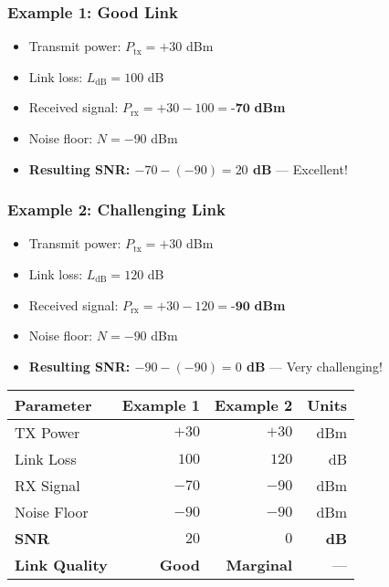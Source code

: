 \subsubsection{Example 1: Good Link}\label{example-1-good-link}

\begin{itemize}
\item Transmit power: $P_{\text{tx}} = +30$ dBm
\item Link loss: $L_{\text{dB}} = 100$ dB
\item Received signal: $P_{\text{rx}} = +30 - 100 = \textbf{-70}$ \textbf{dBm}
\item Noise floor: $N = -90$ dBm
\item \textbf{Resulting SNR: $-70 - (-90) = 20$ dB} --- Excellent!
\end{itemize}

\subsubsection{Example 2: Challenging Link}\label{example-2-challenging-link}

\begin{itemize}
\item Transmit power: $P_{\text{tx}} = +30$ dBm
\item Link loss: $L_{\text{dB}} = 120$ dB
\item Received signal: $P_{\text{rx}} = +30 - 120 = \textbf{-90}$ \textbf{dBm}
\item Noise floor: $N = -90$ dBm
\item \textbf{Resulting SNR: $-90 - (-90) = 0$ dB} --- Very challenging!
\end{itemize}

\begin{center}
\begin{tabular}{@{}lrrr@{}}
\toprule
\textbf{Parameter} & \textbf{Example 1} & \textbf{Example 2} & \textbf{Units} \\
\midrule
TX Power & $+30$ & $+30$ & dBm \\
Link Loss & $100$ & $120$ & dB \\
RX Signal & $-70$ & $-90$ & dBm \\
Noise Floor & $-90$ & $-90$ & dBm \\
\textbf{SNR} & \textbf{$20$} & \textbf{$0$} & \textbf{dB} \\
\textbf{Link Quality} & \textbf{Good} & \textbf{Marginal} & --- \\
\bottomrule
\end{tabular}
\end{center}

